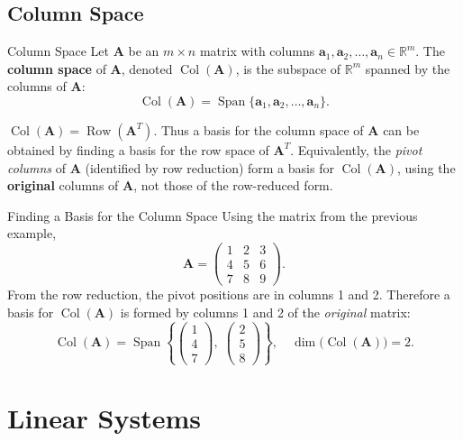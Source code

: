 \documentclass[12pt,a4paper]{article}
\newcommand{\R}{\mathbb{R}}
\newcommand{\vv}[1]{\mathbf{#1}}
\newcommand{\Span}{\operatorname{Span}}
\newcommand{\Col}{\operatorname{Col}}
\newcommand{\Row}{\operatorname{Row}}
\newcommand{\mat}[1]{\mathbf{#1}}
\begin{document}
	\subsection{Column Space}
	
	\begin{defbox}{Column Space}{}
		Let \(\mat{A}\) be an \(m \times n\) matrix with columns
		\(\vv{a}_1, \vv{a}_2, \ldots, \vv{a}_n \in \R^m\).
		The \textbf{column space} of \(\mat{A}\), denoted \(\Col(\mat{A})\), is the subspace of
		\(\R^m\) spanned by the columns of \(\mat{A}\):
		\[
		\Col(\mat{A}) = \Span\{\vv{a}_1, \vv{a}_2, \ldots, \vv{a}_n\}.
		\]
	\end{defbox}
	
	\begin{remarkbox}{}{}
		\(\Col(\mat{A}) = \Row(\mat{A}^T)\). Thus a basis for the column space of \(\mat{A}\)
		can be obtained by finding a basis for the row space of \(\mat{A}^T\).
		Equivalently, the \emph{pivot columns} of \(\mat{A}\) (identified by row reduction)
		form a basis for \(\Col(\mat{A})\), using the \textbf{original} columns of \(\mat{A}\),
		not those of the row-reduced form.
	\end{remarkbox}
	
	\begin{exbox}{Finding a Basis for the Column Space}{}
		Using the matrix from the previous example,
		\[
		\mat{A} =
		\begin{pmatrix}
			1 & 2 & 3 \\
			4 & 5 & 6 \\
			7 & 8 & 9
		\end{pmatrix}.
		\]
		From the row reduction, the pivot positions are in columns 1 and 2.
		Therefore a basis for \(\Col(\mat{A})\) is formed by columns 1 and 2 of the
		\emph{original} matrix:
		\[
		\Col(\mat{A}) = \Span\!\left\{
		\begin{pmatrix}1\\4\\7\end{pmatrix},\;
		\begin{pmatrix}2\\5\\8\end{pmatrix}
		\right\}, \quad
		\dim\bigl(\Col(\mat{A})\bigr) = 2.
		\]
	\end{exbox}
	
	\section{Linear Systems}
	
\end{document}
